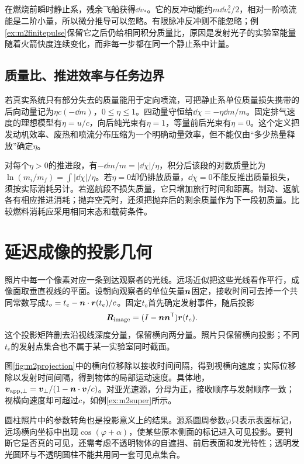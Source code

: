 在燃烧前瞬时静止系，残余飞船获得$\dd v_*$。它的反冲动能约$m\dd v_*^2/2$，相对一阶喷流能是二阶小量，所以微分推导可以忽略。有限脉冲反冲则不能忽略；例\ref{ex:m2finitepulse}保留它之后仍给相同积分质量比，原因是发射光子的实验室能量随着火箭快度连续变化，而非每一步都在同一个静止系中计量。

\subsection{质量比、推进效率与任务边界}
若真实系统只有部分失去的质量能用于定向喷流，可把静止系单位质量损失携带的后向动量记为$\eta c(-\dd m)$，$0\leq\eta\leq1$。四动量守恒给$\dd\chi=-\eta\dd m/m$。固定排气速度的理想模型有$\eta=u/c$，向后纯光束有$\eta=1$，等量前后光束有$\eta=0$。这个定义把发动机效率、废热和喷流分布压缩为一个明确动量效率，但不能仅由“多少热量释放”确定$\eta$。

对每个$\eta>0$的推进段，有$-\dd m/m=|\dd\chi|/\eta$，积分后该段的对数质量比为$\ln(m_i/m_f)=\int|\dd\chi|/\eta$。若$\eta=0$却仍排放质量，$\dd\chi=0$不能反推出质量损失，须按实际消耗另计。若巡航段不损失质量，它只增加旅行时间和距离。制动、返航各有相应推进消耗；抛弃空壳时，还须把抛弃后的剩余质量作为下一段初质量。比较燃料消耗应采用相同末态和载荷条件。

\section{延迟成像的投影几何}
照片中每一个像素对应一条到达观察者的光线。远场近似把这些光线看作平行，成像面取垂直视线的平面。设朝向观察者的单位矢量$\bm{n}$固定，接收时间可去掉一个共同常数写成$t_o=t_e-\bm{n}\cdot\bm{r}(t_e)/c$。固定$t_o$首先确定发射事件，随后投影
\[
 \bm{R}_{\rm image}=(I-\bm{n}\bm{n}^{\mathsf T})\bm{r}(t_e).
\]
这个投影矩阵删去沿视线深度分量，保留横向两分量。照片只保留横向投影；不同$t_e$的发射点集合也不属于某一实验室同时截面。

图\ref{fig:m2projection}中的横向位移除以接收时间间隔，得到视横向速度；实际位移除以发射时间间隔，得到物体的局部运动速度。具体地，$\bm{v}_{\rm app,\perp}=\bm{v}_\perp/(1-\bm{n}\cdot\bm{v}/c)$。对亚光速源，分母为正，接收顺序与发射顺序一致；视横向速度却可超过$c$，如例\ref{ex:m2super}所示。

圆柱照片中的参数转角也是投影意义上的结果。源系圆周参数$\varphi$只表示表面标记，远场横向坐标中出现$\cos(\varphi+\alpha)$，使某些原本侧面的标记进入可见投影。要判断它是否真的可见，还需考虑不透明物体的自遮挡、前后表面和发光特性；透明发光圆环与不透明圆柱不能共用同一套可见点集合。

